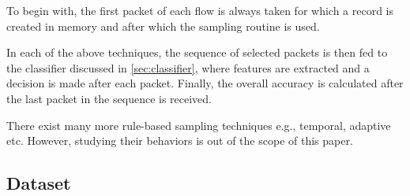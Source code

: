 \documentclass[conference]{IEEEtran}
\begin{document}
To begin with, the first packet of each flow is always taken for which a record is created in memory and after which the sampling routine is used. 

In each of the above techniques, the sequence of selected packets is then fed to the classifier discussed in \autoref{sec:classifier}, where features are extracted and a decision is made after each packet. Finally, the overall accuracy is calculated after the last packet in the sequence is received.

There exist many more rule-based sampling techniques e.g., temporal, adaptive etc. However, studying their behaviors is out of the scope of this paper.

\subsection{Dataset}
\end{document}
